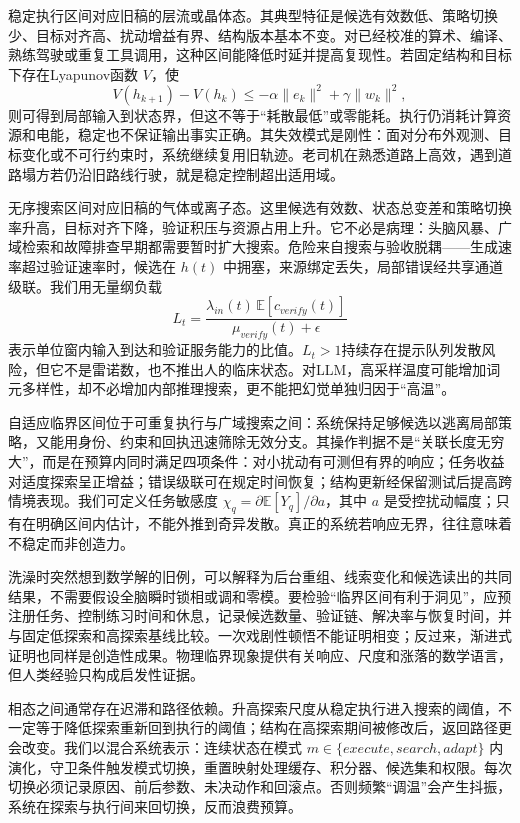 稳定执行区间对应旧稿的层流或晶体态。其典型特征是候选有效数低、策略切换少、目标对齐高、扰动增益有界、结构版本基本不变。对已经校准的算术、编译、熟练驾驶或重复工具调用，这种区间能降低时延并提高复现性。若固定结构和目标下存在Lyapunov函数 $V$，使
\[
 V(h_{k+1})-V(h_k)\le-\alpha\|e_k\|^2+\gamma\|w_k\|^2,
\]
则可得到局部输入到状态界，但这不等于“耗散最低”或零能耗。执行仍消耗计算资源和电能，稳定也不保证输出事实正确。其失效模式是刚性：面对分布外观测、目标变化或不可行约束时，系统继续复用旧轨迹。老司机在熟悉道路上高效，遇到道路塌方若仍沿旧路线行驶，就是稳定控制超出适用域。

无序搜索区间对应旧稿的气体或离子态。这里候选有效数、状态总变差和策略切换率升高，目标对齐下降，验证积压与资源占用上升。它不必是病理：头脑风暴、广域检索和故障排查早期都需要暂时扩大搜索。危险来自搜索与验收脱耦——生成速率超过验证速率时，候选在 $h(t)$ 中拥塞，来源绑定丢失，局部错误经共享通道级联。我们用无量纲负载
\[
 L_t=\frac{\lambda_{in}(t)\,\mathbb E[c_{verify}(t)]}{\mu_{verify}(t)+\epsilon}
\]
表示单位窗内输入到达和验证服务能力的比值。$L_t>1$持续存在提示队列发散风险，但它不是雷诺数，也不推出人的临床状态。对LLM，高采样温度可能增加词元多样性，却不必增加内部推理搜索，更不能把幻觉单独归因于“高温”。

自适应临界区间位于可重复执行与广域搜索之间：系统保持足够候选以逃离局部策略，又能用身份、约束和回执迅速筛除无效分支。其操作判据不是“关联长度无穷大”，而是在预算内同时满足四项条件：对小扰动有可测但有界的响应；任务收益对适度探索呈正增益；错误级联可在规定时间恢复；结构更新经保留测试后提高跨情境表现。我们可定义任务敏感度 $\chi_q=\partial\mathbb E[Y_q]/\partial a$，其中 $a$ 是受控扰动幅度；只有在明确区间内估计，不能外推到奇异发散。真正的系统若响应无界，往往意味着不稳定而非创造力。

洗澡时突然想到数学解的旧例，可以解释为后台重组、线索变化和候选读出的共同结果，不需要假设全脑瞬时锁相或调和零模。要检验“临界区间有利于洞见”，应预注册任务、控制练习时间和休息，记录候选数量、验证链、解决率与恢复时间，并与固定低探索和高探索基线比较。一次戏剧性顿悟不能证明相变；反过来，渐进式证明也同样是创造性成果。物理临界现象提供有关响应、尺度和涨落的数学语言，但人类经验只构成启发性证据。

相态之间通常存在迟滞和路径依赖。升高探索尺度从稳定执行进入搜索的阈值，不一定等于降低探索重新回到执行的阈值；结构在高探索期间被修改后，返回路径更会改变。我们以混合系统表示：连续状态在模式 $m\in\{execute,search,adapt\}$ 内演化，守卫条件触发模式切换，重置映射处理缓存、积分器、候选集和权限。每次切换必须记录原因、前后参数、未决动作和回滚点。否则频繁“调温”会产生抖振，系统在探索与执行间来回切换，反而浪费预算。

